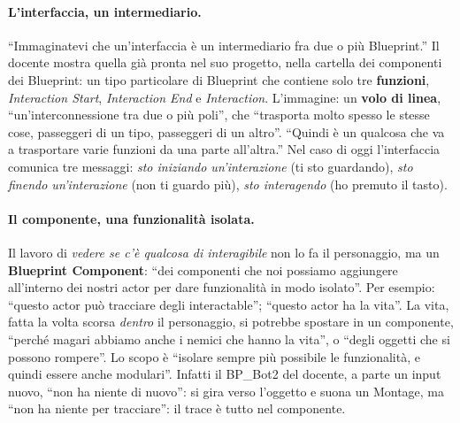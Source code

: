\paragraph{L'interfaccia, un intermediario.} ``Immaginatevi che un'interfaccia è un
intermediario fra due o più Blueprint.'' Il docente mostra quella già pronta nel suo
progetto, nella cartella dei componenti dei Blueprint: un tipo particolare di Blueprint
che contiene solo tre \textbf{funzioni}, \emph{Interaction Start}, \emph{Interaction End}
e \emph{Interaction}. L'immagine: un \textbf{volo di linea}, ``un'interconnessione tra due
o più poli'', che ``trasporta molto spesso le stesse cose, passeggeri di un tipo,
passeggeri di un altro''. ``Quindi è un qualcosa che va a trasportare varie funzioni da una
parte all'altra.'' Nel caso di oggi l'interfaccia comunica tre messaggi: \emph{sto
iniziando un'interazione} (ti sto guardando), \emph{sto finendo un'interazione} (non ti
guardo più), \emph{sto interagendo} (ho premuto il tasto).

\paragraph{Il componente, una funzionalità isolata.} Il lavoro di \emph{vedere se c'è
qualcosa di interagibile} non lo fa il personaggio, ma un \textbf{Blueprint Component}:
``dei componenti che noi possiamo aggiungere all'interno dei nostri actor per dare
funzionalità in modo isolato''. Per esempio: ``questo actor può tracciare degli
interactable''; ``questo actor ha la vita''. La vita, fatta la volta scorsa \emph{dentro}
il personaggio, si potrebbe spostare in un componente, ``perché magari abbiamo anche i
nemici che hanno la vita'', o ``degli oggetti che si possono rompere''. Lo scopo è
``isolare sempre più possibile le funzionalità, e quindi essere anche modulari''. Infatti
il BP\_Bot2 del docente, a parte un input nuovo, ``non ha niente di nuovo'': si gira verso
l'oggetto e suona un Montage, ma ``non ha niente per tracciare'': il trace è tutto nel
componente.

